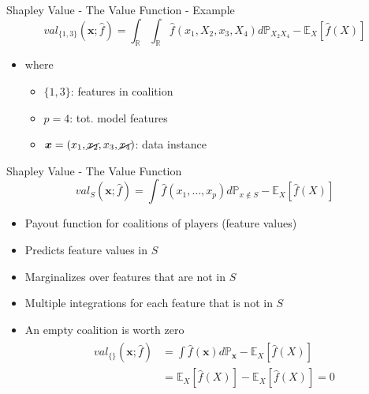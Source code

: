 \begin{frame}{Shapley Value - The Value Function - Example}
	\begin{equation}
		val_{\{1,3\}}\left(\bm{x};\hat{f}\right)=\int_{\mathbb{R}}\int_{\mathbb{R}}\hat{f}(x_{1},X_{2},x_{3},X_{4})d\mathbb{P}_{X_2X_4}-\mathbb{E}_X\left[\hat{f}(X)\right]
	\end{equation}
	\begin{itemize}\setlength\itemsep{2em}
		\item[]
		where
		\begin{itemize}
			\item $\{1,3\}$: features in coalition
			\item $p = 4$: tot. model features
			\item $\bm{x} = (x_1, \cancel{x_2}, x_3, \cancel{x_4})$: data instance
		\end{itemize}
	\end{itemize}
\end{frame}

\begin{frame}{Shapley Value - The Value Function}
	\begin{equation}
		val_S\left(\bm{x};\hat{f}\right)=\int\hat{f}(x_{1},\ldots,x_{p})d\mathbb{P}_{x\notin{}S}-\mathbb{E}_X\left[\hat{f}(X)\right]
	\end{equation}
	\begin{itemize}
		\item<1-> Payout function for coalitions of players (feature values)
		\item<1-> Predicts feature values in $S$
		\item<1-> Marginalizes over features that are not in $S$
		\item<1-> Multiple integrations for each feature that is not in $S$
		\vspace{1em}
		\item<2-> An empty coalition is worth zero
		\begin{align}\begin{split}
				val_{\{\}}\left(\bm{x};\hat{f}\right)&=
				\int\hat{f}(\bm{x})d\mathbb{P}_{\bm{x}}-\mathbb{E}_X\left[\hat{f}(X)\right]\\
				&=\mathbb{E}_X\left[\hat{f}(X)\right]-\mathbb{E}_X\left[\hat{f}(X)\right] = 0
		\end{split}\end{align}
	\end{itemize}
\end{frame}